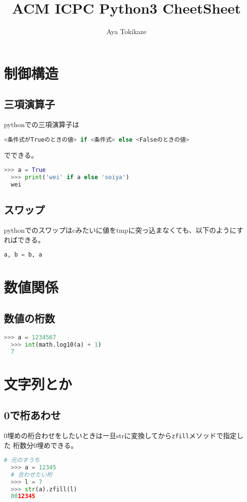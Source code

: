 \documentclass[uplatex, 11pt]{jsarticle}
\title{ACM ICPC Python3 CheetSheet}
\author{Aya Tokikaze}
\begin{document}
\maketitle

\tableofcontents



\section{制御構造}

\subsection{三項演算子}
pythonでの三項演算子は
\begin{lstlisting}[language=Python]
  <条件式がTrueのときの値> if <条件式> else <Falseのときの値>
\end{lstlisting}

でできる。

\begin{lstlisting}[language=Python]
  >>> a = True
  >>> print('wei' if a else 'soiya')
  wei
\end{lstlisting}

\subsection{スワップ}

pythonでのスワップはcみたいに値をtmpに突っ込まなくても、以下のようにすればできる。

\begin{lstlisting}[language=Python]
  a, b = b, a
\end{lstlisting}



\section{数値関係}

\subsection{数値の桁数}

\begin{lstlisting}[language=Python]
  >>> a = 1234567
  >>> int(math.log10(a) + 1)
  7
\end{lstlisting}

\section{文字列とか}

\subsection{0で桁あわせ}
0埋めの桁合わせをしたいときは一旦strに変換してから\texttt{zfill}メソッドで指定した
桁数分0埋めできる。
\begin{lstlisting}[language=Python]
  # 元のすうち
  >>> a = 12345
  # 合わせたい桁
  >>> l = 7
  >>> str(a).zfill(l)
  0012345
\end{lstlisting}
\end{document}
